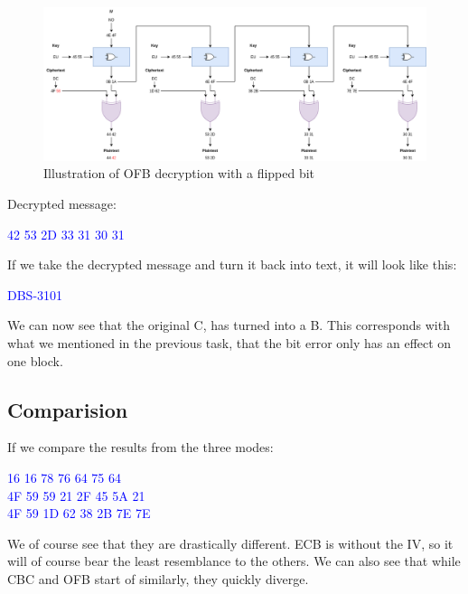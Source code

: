 \documentclass{article}
\begin{document}
\begin{figure}[H]
 \centering
  \includegraphics[width=400pt]{img/OFBDec.png}
 \caption{Illustration of OFB decryption with a flipped bit}
 \end{figure}

Decrypted message: 
\begin{tcolorbox}
\begin{center}
\textcolor{blue}{
 42 53 2D 33 31 30 31}
\end{center}
\end{tcolorbox}


If we take the decrypted message and turn it back into text, it will look like this:
\begin{tcolorbox}
\begin{center}
\textcolor{blue}{
\qquad DBS-3101}
\end{center}
\end{tcolorbox}

We can now see that the original C, has turned into a B. This corresponds with what we mentioned in the previous task, that the bit error only has an effect on one block. 

\subsection{Comparision}
If we compare the results from the three modes:
\begin{tcolorbox}
\textcolor{blue}{
 16 16 78 76 64 75 64\\
\qquad 4F 59 59 21 2F 45 5A 21\\
\qquad 4F 59 1D 62 38 2B 7E 7E}
\end{tcolorbox}

We of course see that they are drastically different. ECB is without the IV, so it will of course bear the least resemblance to the others. We can also see that while CBC and OFB start of similarly, they quickly diverge. 
\end{document}
